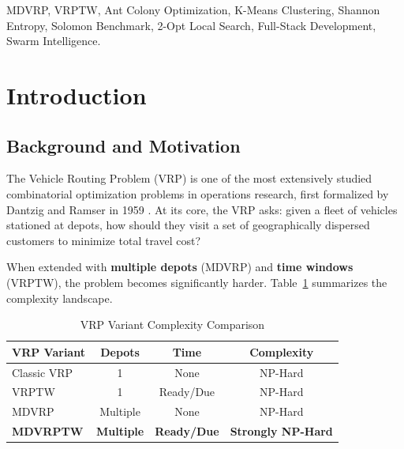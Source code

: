 \documentclass[10pt,conference]{IEEEtran}
\begin{document}
\begin{IEEEkeywords}
MDVRP, VRPTW, Ant Colony Optimization, K-Means Clustering, Shannon Entropy, Solomon Benchmark, 2-Opt Local Search, Full-Stack Development, Swarm Intelligence.
\end{IEEEkeywords}

\section{Introduction}

\subsection{Background and Motivation}
The Vehicle Routing Problem (VRP) is one of the most extensively studied combinatorial optimization problems in operations research, first formalized by Dantzig and Ramser in 1959 \cite{b1}. At its core, the VRP asks: given a fleet of vehicles stationed at depots, how should they visit a set of geographically dispersed customers to minimize total travel cost?

When extended with \textbf{multiple depots} (MDVRP) and \textbf{time windows} (VRPTW), the problem becomes significantly harder. Table~\ref{tab:vrp_variants} summarizes the complexity landscape.

\begin{table}[h]
\caption{VRP Variant Complexity Comparison}
\label{tab:vrp_variants}
\begin{center}
\begin{tabular}{|l|c|c|c|}
\hline
\textbf{VRP Variant} & \textbf{Depots} & \textbf{Time} & \textbf{Complexity} \\
\hline
Classic VRP & 1 & None & NP-Hard \\
VRPTW & 1 & Ready/Due & NP-Hard \\
MDVRP & Multiple & None & NP-Hard \\
\textbf{MDVRPTW} & \textbf{Multiple} & \textbf{Ready/Due} & \textbf{Strongly NP-Hard} \\
\hline
\end{tabular}
\end{center}
\end{table}
\end{document}
